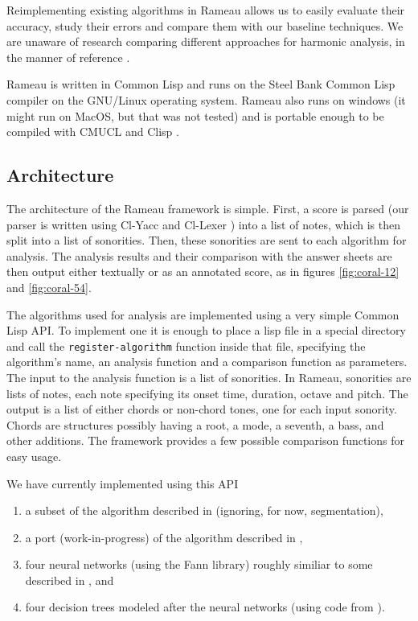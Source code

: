 \documentclass{article}
\begin{document}
Reimplementing existing algorithms in Rameau allows us to easily
evaluate their accuracy, study their errors and compare them with our
baseline techniques. We are unaware of research comparing different
approaches for harmonic analysis, in the manner of reference
\cite{gomez.herrera:tonality}.

Rameau is written in Common Lisp and runs on the Steel Bank Common
Lisp \cite{team07:_sbcl} compiler on the GNU/Linux operating
system. Rameau also runs on windows (it might run on MacOS, but that was
not tested) and is portable enough to be compiled with CMUCL
\cite{maclachlan06:_cmucl_users_manual} and Clisp
\cite{haible07:_clisp}.

\subsection{Architecture}
\label{sec:architecture-and-api}

The architecture of the Rameau framework is simple. First, a score is
parsed (our parser is written using Cl-Yacc
\cite{chroboczek:_cl_yacc_manual} and Cl-Lexer
\cite{parker:_lexer_packag}) into a list of notes, which is then split
into a list of sonorities. Then, these sonorities are sent to each
algorithm for analysis. The analysis results and their comparison with
the answer sheets are then output either textually or as an annotated
score, as in figures \ref{fig:coral-12} and \ref{fig:coral-54}.

The algorithms used for analysis are implemented using a very simple
Common Lisp API. To implement one it is enough to place a lisp file in
a special directory and call the \texttt{register-algorithm} function
inside that file, specifying the algorithm's name, an analysis
function and a comparison function as parameters. The input to the
analysis function is a list of sonorities. In Rameau, sonorities are
lists of notes, each note specifying its onset time, duration, octave
and pitch. The output is a list of either chords or non-chord tones,
one for each input sonority. Chords are structures possibly having a
root, a mode, a seventh, a bass, and other additions. The
framework provides a few possible comparison functions for easy
usage.

We have currently implemented using this API 
\begin{enumerate}
\item a subset of the algorithm described in \cite{pardo02:algorithms}
  (ignoring, for now, segmentation), 
\item a port (work-in-progress) of the algorithm described in
  \cite{temperley99:modeling}, 
\item four neural networks (using the Fann \cite{nissen:fann}
  library) roughly similiar to some described in
  \cite{tsui02:_harmon_analy_using_neural_networ}, and
\item four decision trees modeled after the neural networks (using code
  from \cite{Mitchell:1997:ML}).
\end{enumerate}
\end{document}
